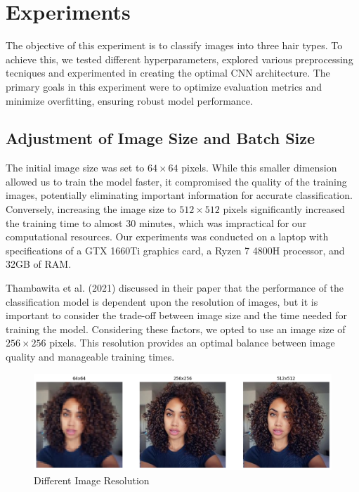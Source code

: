 \section{Experiments}

The objective of this experiment is to classify images into three hair types. To achieve this, we tested different hyperparameters, explored various preprocessing tecniques and experimented in creating the optimal CNN architecture. The primary goals in this experiment were to optimize evaluation metrics and minimize overfitting, ensuring robust model performance.

\subsection{Adjustment of Image Size and Batch Size}

The initial image size was set to \(64 \times 64\) pixels. While this smaller dimension allowed us to train the model faster, it compromised the quality of the training images, potentially eliminating important information for accurate classification. Conversely, increasing the image size to \(512 \times 512\) pixels significantly increased the training time to almost 30 minutes, which was impractical for our computational resources. Our experiments was conducted on a laptop with specifications of a GTX 1660Ti graphics card, a Ryzen 7 4800H processor, and 32GB of RAM.

Thambawita et al. (2021) \cite{smith2021edge} discussed in their paper that the performance of the classification model is dependent upon the resolution of images, but it is important to consider the trade-off between image size and the time needed for training the model. Considering these factors, we opted to use an image size of \(256 \times 256\) pixels. This resolution provides an optimal balance between image quality and manageable training times. 

\begin{figure}[H]
    \includegraphics[width=\linewidth]{figures/image_sizes.png}
    \caption{Different Image Resolution}
    \label{fig:image_sizes}
  \end{figure}

